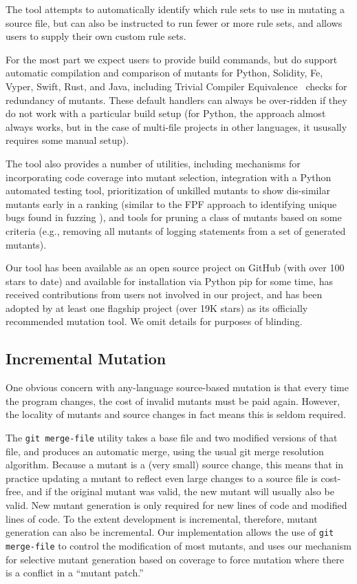 \documentclass[sigconf,review, anonymous]{acmart}
\begin{document}
{The tool attempts to automatically identify which rule sets to use in
mutating a source file, but can also be instructed to run fewer or
more rule sets, and allows users to supply their own custom rule sets.

For the most part we expect users to provide build commands, but do
support automatic compilation and comparison of mutants for Python,
Solidity, Fe, Vyper, Swift, Rust, and Java, including Trivial Compiler
Equivalence~\cite{TCE} checks for redundancy of mutants.  These
default handlers can always be over-ridden if they do not work with a
particular build setup (for Python, the approach almost always works,
but in the case of multi-file projects in other languages, it ususally
requires some manual setup).

The tool also provides a number of utilities, including mechanisms for
incorporating code coverage into mutant selection, integration with a
Python automated testing tool, prioritization of unkilled mutants to
show dis-similar mutants early in a ranking (similar to the FPF
approach to identifying unique bugs found in fuzzing
\cite{10.1145/2491956.2462173}), and tools for pruning a class of
mutants based on some criteria (e.g., removing all mutants of logging
statements from a set of generated mutants).

Our tool has been available as an open source project on GitHub (with
over 100 stars to date) and
available for installation via Python pip for
some time, has received contributions from users not involved in
our project, and has been adopted by at least one flagship project
(over 19K stars) as
its officially recommended mutation tool.  We omit details for
purposes of blinding.

\subsection{Incremental Mutation}

One obvious concern with any-language source-based mutation is that every time the
program changes, the cost of invalid mutants must be paid again.
However, the locality of mutants and source changes in fact means this
is seldom required.

The {\tt git merge-file} utility takes a base file and two modified
versions of that file, and produces an automatic merge, using the
usual git merge resolution algorithm.    Because a mutant is a (very
small) source change, this means that in practice updating a mutant to
reflect even large changes to a source file is cost-free, and if the
original mutant was valid, the new mutant will usually also be valid.
New mutant generation is only required for new lines of code and
modified lines of code.  To the extent development is incremental,
therefore, mutant generation can also be incremental.  Our
implementation allows the use of {\tt git merge-file} to control the
modification of most mutants, and uses our mechanism for
selective mutant generation based on coverage to force mutation where
there is a conflict in a ``mutant patch.''

}
\end{document}
